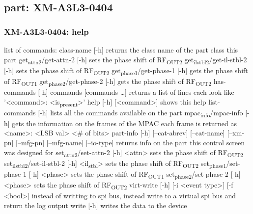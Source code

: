 \documentclass[11pt]{article}
\begin{document}
\subsection{part: XM-A3L3-0404}
\label{sec:org90d9e89}
\subsubsection{XM-A3L3-0404: help}
\label{sec:org135aa94}
list of commands:
  class-name [-h]
    returns the class name of the part class this part
  get\textsubscript{attn}\textsubscript{2}/get-attn-2 [-h]
    sets the phase shift of RF\textsubscript{OUT2}
  get\textsubscript{il}\textsubscript{stbl}\textsubscript{2}/get-il-stbl-2 [-h]
    sets the phase shift of RF\textsubscript{OUT2}
  get\textsubscript{phase}\textsubscript{1}/get-phase-1 [-h]
    gets the phase shift of RF\textsubscript{OUT1}
  get\textsubscript{phase}\textsubscript{2}/get-phase-2 [-h]
    gets the phase shift of RF\textsubscript{OUT2}
  has-commands [-h] commands [commands \ldots{}]
    returns a list of lines each look like '<command>: <is\textsubscript{present}>'
  help [-h] [<command>]
    shows this help
  list-commands [-h]
    lists all the commands available on the part
  mpac\textsubscript{info}/mpac-info [-h]
    gets the information on the frames of the MPAC
    each frame is returned as <name>: <LSB val> <\# of bits>
  part-info  [-h] [--cat-abrev] [--cat-name] [--xm-pn] [--mfg-pn] [--mfg-name]
          [--io-type]
    returns info on the part this control screen was designed for
  set\textsubscript{attn}\textsubscript{2}/set-attn-2 [-h] <attn>
    sets the phase shift of RF\textsubscript{OUT2}
  set\textsubscript{il}\textsubscript{stbl}\textsubscript{2}/set-il-stbl-2 [-h] <il\textsubscript{stbl}>
    sets the phase shift of RF\textsubscript{OUT2}
  set\textsubscript{phase}\textsubscript{1}/set-phase-1 [-h] <phase>
    sets the phase shift of RF\textsubscript{OUT1}
  set\textsubscript{phase}\textsubscript{2}/set-phase-2 [-h] <phase>
    sets the phase shift of RF\textsubscript{OUT2}
  virt-write [-h] [-i <event type>] [-f <bool>]
    instead of writting to spi bus, instead write to a virtual spi bus
    and return the log output
  write [-h]
    writes the data to the device
\end{document}
